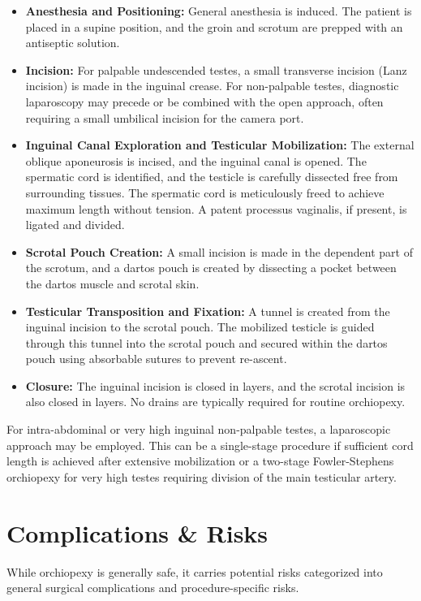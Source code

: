 \begin{itemize}
  \item \textbf{Anesthesia and Positioning:} General anesthesia is induced. The patient is placed in a supine position, and the groin and scrotum are prepped with an antiseptic solution.
  
  \item \textbf{Incision:} For palpable undescended testes, a small transverse incision (Lanz incision) is made in the inguinal crease. For non-palpable testes, diagnostic laparoscopy may precede or be combined with the open approach, often requiring a small umbilical incision for the camera port.
  
  \item \textbf{Inguinal Canal Exploration and Testicular Mobilization:} The external oblique aponeurosis is incised, and the inguinal canal is opened. The spermatic cord is identified, and the testicle is carefully dissected free from surrounding tissues. The spermatic cord is meticulously freed to achieve maximum length without tension. A patent processus vaginalis, if present, is ligated and divided.
  
  \item \textbf{Scrotal Pouch Creation:} A small incision is made in the dependent part of the scrotum, and a dartos pouch is created by dissecting a pocket between the dartos muscle and scrotal skin.
  
  \item \textbf{Testicular Transposition and Fixation:} A tunnel is created from the inguinal incision to the scrotal pouch. The mobilized testicle is guided through this tunnel into the scrotal pouch and secured within the dartos pouch using absorbable sutures to prevent re-ascent.
  
  \item \textbf{Closure:} The inguinal incision is closed in layers, and the scrotal incision is also closed in layers. No drains are typically required for routine orchiopexy.
\end{itemize}

For intra-abdominal or very high inguinal non-palpable testes, a laparoscopic approach may be employed. This can be a single-stage procedure if sufficient cord length is achieved after extensive mobilization or a two-stage Fowler-Stephens orchiopexy for very high testes requiring division of the main testicular artery.

\section*{Complications \& Risks}
While orchiopexy is generally safe, it carries potential risks categorized into general surgical complications and procedure-specific risks.

